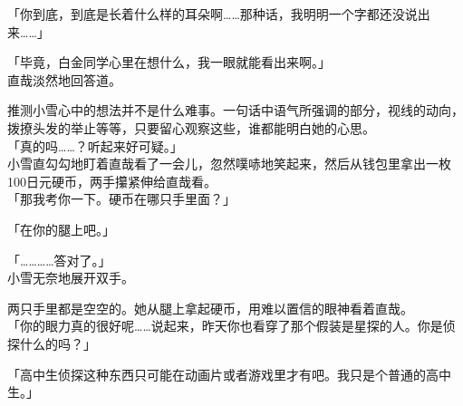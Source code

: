 「你到底，到底是长着什么样的耳朵啊……那种话，我明明一个字都还没说出来……」

「毕竟，白金同学心里在想什么，我一眼就能看出来啊。」\\

直哉淡然地回答道。

推测小雪心中的想法并不是什么难事。一句话中语气所强调的部分，视线的动向，拨撩头发的举止等等，只要留心观察这些，谁都能明白她的心思。\\

「真的吗……？听起来好可疑。」\\

小雪直勾勾地盯着直哉看了一会儿，忽然噗哧地笑起来，然后从钱包里拿出一枚100日元硬币，两手攥紧伸给直哉看。\\

「那我考你一下。硬币在哪只手里面？」

「在你的腿上吧。」

「…………答对了。」\\

小雪无奈地展开双手。

两只手里都是空空的。她从腿上拿起硬币，用难以置信的眼神看着直哉。\\

「你的眼力真的很好呢……说起来，昨天你也看穿了那个假装是星探的人。你是侦探什么的吗？」

「高中生侦探这种东西只可能在动画片或者游戏里才有吧。我只是个普通的高中生。」

